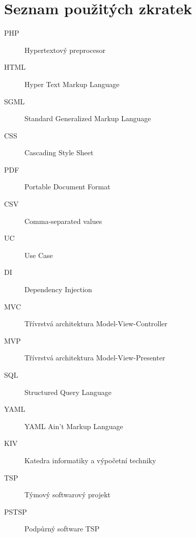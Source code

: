 \documentclass[czech,BP]{thesiskiv}
\begin{document}
\chapter*{Seznam použitých zkratek}
\begin{description}
	\item[PHP] Hypertextový preprocesor
	\item[HTML] Hyper Text Markup Language
	\item[SGML] Standard Generalized Markup Language
	\item[CSS] Cascading Style Sheet
	\item[PDF] Portable Document Format
	\item[CSV] Comma-separated values
	\item[UC] Use Case
	\item[DI] Dependency Injection
	\item[MVC] Třívrstvá architektura Model-View-Controller
	\item[MVP] Třívrstvá architektura Model-View-Presenter
	\item[SQL] Structured Query Language
	\item[YAML] YAML Ain't Markup Language
	\item[KIV] Katedra informatiky a výpočetní techniky
	\item[TSP] Týmový softwarový projekt
	\item[PSTSP] Podpůrný software TSP
\end{description}
%

\end{document}
